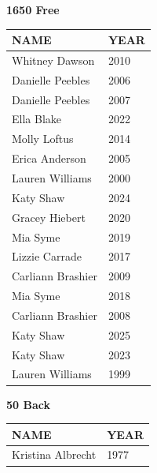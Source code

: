 \begin{table}[H]
\centering
\begin{minipage}[t]{0.48\textwidth}
\centering
\textbf{1650 Free}\\[0.1cm]
\begin{tabular}{@{}p{2.8cm}p{1.2cm}@{}}
\hline
    \textbf{NAME} & \textbf{YEAR} \\
\hline
    Whitney Dawson & 2010 \\
    Danielle Peebles & 2006 \\
    Danielle Peebles & 2007 \\
    Ella Blake & 2022 \\
    Molly Loftus & 2014 \\
    Erica Anderson & 2005 \\
    Lauren Williams & 2000 \\
    Katy Shaw & 2024 \\
    Gracey Hiebert & 2020 \\
    Mia Syme & 2019 \\
    Lizzie Carrade & 2017 \\
    Carliann Brashier & 2009 \\
    Mia Syme & 2018 \\
    Carliann Brashier & 2008 \\
    Katy Shaw & 2025 \\
    Katy Shaw & 2023 \\
    Lauren Williams & 1999 \\
\hline
\end{tabular}
\end{minipage}\hfill
\begin{minipage}[t]{0.48\textwidth}
\centering
\textbf{50 Back}\\[0.1cm]
\begin{tabular}{@{}p{2.8cm}p{1.2cm}@{}}
\hline
    \textbf{NAME} & \textbf{YEAR} \\
\hline
    Kristina Albrecht & 1977 \\
\hline
\end{tabular}
\end{minipage}
\end{table}

